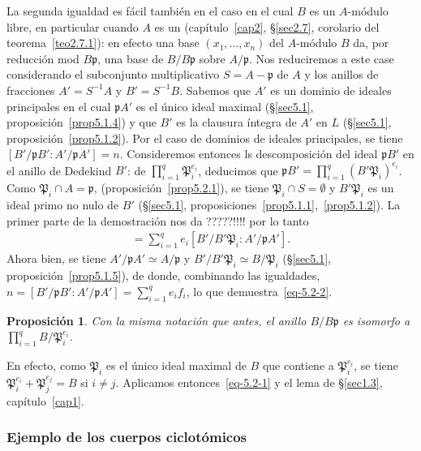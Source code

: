 \documentclass[bibtotoc,leqno,spanish]{amsbook}
\let\emph\relax %
\newcommand{\idl}[1]{\mathfrak{#1}}
\numberwithin{equation}{section}
\theoremstyle{note}
\theoremstyle{note}
\newtheorem{proposition}{Proposici\'on}
\theoremstyle{rem}
\numberwithin{theorem}{section}
\numberwithin{proposition}{section}
\numberwithin{definition}{section}
\numberwithin{lemma}{section}
\numberwithin{corollary}{section}
\numberwithin{example}{section}
\numberwithin{footnote}{section}%
\begin{document}
La segunda igualdad es f\'acil tambi\'en en el caso en el cual $B$ es un $A$-m\'odulo libre, en particular cuando
$A$ es un \emph{dominio de ideales principales}
(cap\'itulo~\ref{cap2}, \S\ref{sec2.7}, corolario del teorema~\ref{teo2.7.1}): en efecto una
base $(x_{1},\dots,x_{n})$ del $A$-m\'odulo $B$ da, por reducci\'on mod $B\idl{p}$, una base de $B/B\idl{p}$ sobre
$A/\idl{p}$. Nos reduciremos a este case considerando el subconjunto multiplicativo $S = A-\idl{p}$ de $A$ y
los anillos de fracciones $A' = S^{-1}A$ y $B' = S^{-1}B$. Sabemos que $A'$ es un dominio de ideales principales
en el cual $\idl{p}A'$ es el \'unico ideal maximal (\S\ref{sec5.1}, proposici\'on~\ref{prop5.1.4}) y que $B'$ es la clausura \'integra de $A'$ en $L$
(\S\ref{sec5.1}, proposici\'on~\ref{prop5.1.2}). Por el caso de dominios de ideales principales, se tiene $[B'/\idl{p}B':A'/\idl{p}A']=n$.
Consideremos entonces ls descomposici\'on del ideal $\idl{p}B'$ en el anillo de Dedekind $B'$:
de $\prod_{i=1}^{q}\idl{P}_{i}^{e_{i}}$, deducimos que $\idl{p}B' = \prod_{i=1}^{q}(B'\idl{P}_{i})^{e_{i}}$. Como
$\idl{P}_{i}\cap A=\idl{p}$, (proposici\'on~\ref{prop5.2.1}), se tiene $\idl{P}_{i}\cap S = \emptyset$ y $B'\idl{P}_{i}$ es un ideal primo
no nulo de $B'$ (\S\ref{sec5.1}, proposiciones~\ref{prop5.1.1},~\ref{prop5.1.2}). La primer parte de la demostraci\'on nos da ?????!!!! por lo tanto
\begin{gather*}
[B'/\idl{p}B':A'/\idl{p}A']=\sum_{i=1}^{q}e_{i}[B'/B'\idl{P}_{i}:A'/\idl{p}A'].
\end{gather*}
Ahora bien, se tiene $A'/\idl{p}A'\simeq A/\idl{p}$ y $B'/B'\idl{P}_{i}\simeq B/\idl{P}_{i}$ (\S\ref{sec5.1},
proposici\'on~\ref{prop5.1.5}),
de donde, combinando las igualdades, $n=[B'/\idl{p}B':A'/\idl{p}A']=\sum_{i=1}^{q}e_{i}f_{i}$, lo que
demuestra~\eqref{eq-5.2-2}.

\begin{proposition}\label{prop5.2.2}
Con la misma notaci\'on que antes, el anillo $B/B\idl{p}$ es isomorfo a $\prod_{i=1}^{q}B/\idl{P}_{i}^{e_{i}}$.
\end{proposition}

En efecto, como $\idl{P}_{i}$ es el \'unico ideal maximal de $B$ que contiene a $\idl{P}_{i}^{e_{i}}$, se tiene
$\idl{P}_{i}^{e_{i}}+\idl{P}_{j}^{e_{j}}=B$ si $i\neq j$. Aplicamos entonces~\eqref{eq-5.2-1} y el
lema de \S\ref{sec1.3}, cap\'itulo~\ref{cap1}.

\subsubsection*{Ejemplo de los cuerpos ciclot\'omicos}
\end{document}
